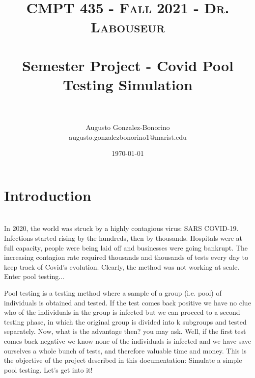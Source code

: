 \documentclass[letterpaper, 10pt]{article}
\title{	
   \normalfont \normalsize 
   \textsc{CMPT 435 - Fall 2021 - Dr. Labouseur} \\[10pt] %
   \horrule{0.5pt} \\[0.25cm] 	%
   \huge Semester Project - Covid Pool Testing Simulation \\     	    %
   \horrule{0.5pt} \\[0.25cm] 	%
}
\author{Augusto Gonzalez-Bonorino \\ \normalsize augusto.gonzalezbonorino1@marist.edu}
\date{\normalsize\today} 	%
\begin{document}
\maketitle %



\section{Introduction}
\\
In 2020, the world was struck by a highly contagious virus: SARS COVID-19. Infections started rising by the hundreds, then by thousands. Hospitals were at full capacity, people were being laid off and businesses were going bankrupt. The increasing contagion rate required thousands and thousands of tests every day to keep track of Covid's evolution. Clearly, the method was not working at scale. Enter pool testing... 

Pool testing is a testing method where a sample of a group (i.e. pool) of individuals is obtained and tested. If the test comes back positive we have no clue who of the individuals in the group is infected but we can proceed to a second testing phase, in which the original group is divided into k subgroups and tested separately. Now, what is the advantage then? you may ask. Well, if the first test comes back negative we know none of the individuals is infected and we have save ourselves a whole bunch of tests, and therefore valuable time and money. This is the objective of the project described in this documentation: Simulate a simple pool testing. Let's get into it!
\\
\end{document}
